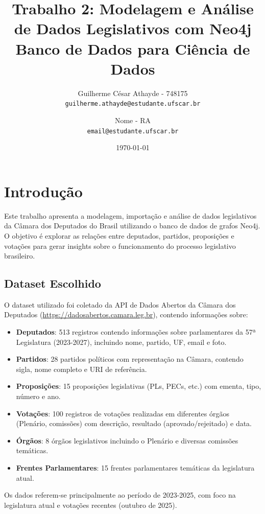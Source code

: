 \documentclass[12pt,a4paper]{article}
\title{
    \textbf{Trabalho 2: Modelagem e Análise de Dados Legislativos com Neo4j}\\
    \large Banco de Dados para Ciência de Dados
}
\author{
    Guilherme César Athayde - 748175 \\
    \texttt{guilherme.athayde@estudante.ufscar.br}
    \and
    Nome - RA \\
    \texttt{email@estudante.ufscar.br}
}
\date{\today}
\begin{document}
\maketitle
\thispagestyle{empty}

\newpage
\tableofcontents
\newpage

\section{Introdução}

Este trabalho apresenta a modelagem, importação e análise de dados legislativos da Câmara dos Deputados do Brasil utilizando o banco de dados de grafos Neo4j. O objetivo é explorar as relações entre deputados, partidos, proposições e votações para gerar insights sobre o funcionamento do processo legislativo brasileiro.

\subsection{Dataset Escolhido}

O dataset utilizado foi coletado da API de Dados Abertos da Câmara dos Deputados (\url{https://dadosabertos.camara.leg.br}), contendo informações sobre:

\begin{itemize}
    \item \textbf{Deputados}: 513 registros contendo informações sobre parlamentares da 57ª Legislatura (2023-2027), incluindo nome, partido, UF, email e foto.
    \item \textbf{Partidos}: 28 partidos políticos com representação na Câmara, contendo sigla, nome completo e URI de referência.
    \item \textbf{Proposições}: 15 proposições legislativas (PLs, PECs, etc.) com ementa, tipo, número e ano.
    \item \textbf{Votações}: 100 registros de votações realizadas em diferentes órgãos (Plenário, comissões) com descrição, resultado (aprovado/rejeitado) e data.
    \item \textbf{Órgãos}: 8 órgãos legislativos incluindo o Plenário e diversas comissões temáticas.
    \item \textbf{Frentes Parlamentares}: 15 frentes parlamentares temáticas da legislatura atual.
\end{itemize}

Os dados referem-se principalmente ao período de 2023-2025, com foco na legislatura atual e votações recentes (outubro de 2025).
\end{document}
